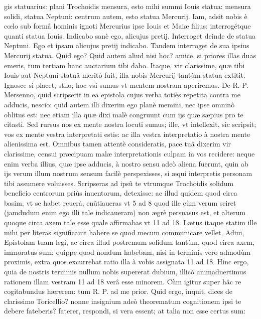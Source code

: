 \documentclass[11pt,a4paper]{article}
\begin{document}


gis statuarius: plani Trochoidis mensura, esto mihi summi Iouis statua: mensura solidi, statua Neptuni: centrum autem, esto statua Mercurij. Iam, adsit nobis è cœlo sub formâ hominis ignoti Mercurius ipse Iouis et Maiæ filius: interrogétque quanti statua Iouis. Indicabo sanè ego, alicujus pretij. Interroget deinde de statua Neptuni. Ego et ipsam alicujus pretij indicabo. Tandem interroget de sua ipsius Mercurij statua. Quid ego? Quid autem aliud nisi hoc? amice, si priores illas duas emeris, tum tertiam hanc auctarium tibi dabo. Itaque, vir clarissime, quæ tibi Iouis aut Neptuni statuâ meritò fuit, illa nobis Mercurij tantùm statua extitit. Ignosce si placet, stilo; hoc vsi sumus vt mentem nostram aperiremus. De R. P. Mersenno, quid scripserit in ea epistola cujus verba totiès repetita contra me adducis, nescio: quid autem illi dixerim ego planè memini, nec ipse omninò oblitus est: nec etiam illa quæ dixi malè congruunt cum ijs quæ sæpius pro te citasti. Sed rursus nos ex mente nostra locuti sumus; ille, vt intellexit, sic scripsit; vos ex mente vestra interpretati estis: ac illa vestra interpretatio à nostra mente alienissima est. Omnibus tamen attentè consideratis, pace tuâ dixerim vir clarissime, censui præcipuam malæ interpretationis culpam in vos recidere: neque enim verba illius, quæ ipse adducis, à nostro sensu adeò aliena fuerunt, quin ab ijs verum illum nostrum sensum facilè perspexisses, si æqui interpretis personam tibi assumere voluisses. Scripseras ad ipsũ te vtrumque Trochoidis solidum beneficio centrorum priùs inuentorum, detexisse: ac illud quidem quod circa basim, vt se habet reuerà, enũtiaueras vt 5 ad 8 quod ille cùm verum sciret (jamdudum enim ego illi tale indicaueram) non ægrè persuasus est, et alterum quoque circa axem tale esse quale affirmabas vt 11 ad 18. Lætus itaque statim ille mihi per literas significauit habere se quod mecum communicare vellet. Adiui, Epistolam tuam legi, ac circa illud postremum solidum tantùm, quod circa axem, immoratus sum; quippe quod nondum habebam, nisi in terminis vero admodùm proximis, extra quos excurrebat ratio illa à vobis assignata 11 ad 18. Hinc ergo, quia de nostris terminis nullum nobis supererat dubium, illicò animaduertimus rationem illam vestram 11 ad 18 verâ esse minorem. Cùm igitur super hâc re cogitabundus hærerem: tum R. P. ad me prior. Quid ergo, inquit, dices de clarissimo Toricellio? nonne insignium adeò theorematum cognitionem ipsi te debere fateberis? faterer, respondi, si vera essent; at talia non esse certus sum: 
\end{document}

